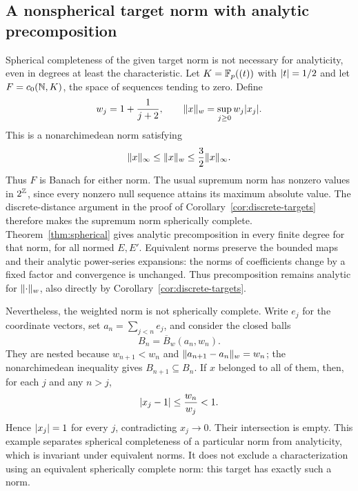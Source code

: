 \subsection{A nonspherical target norm with analytic precomposition}
\begin{remark}\label{rem:nonspherical-analytic-target}
Spherical completeness of the given target norm is not necessary for analyticity, even in degrees
at least the characteristic. Let $K=\mathbb F_p((t))$ with $\lvert t\rvert=1/2$ and let $F=c_0(\mathbb N,K)$, the space
of sequences tending to zero. Define
\[
 w_j=1+\frac1{j+2},\qquad \lVert x\rVert_w=\sup_{j\ge0}w_j\lvert x_j\rvert.
\]
This is a nonarchimedean norm satisfying
\[
 \lVert x\rVert_\infty\le\lVert x\rVert_w\le\frac32\lVert x\rVert_\infty.
\]
Thus $F$ is Banach for either norm. The usual supremum norm has nonzero values in $2^\mathbb Z$,
since every nonzero null sequence attains its maximum absolute value. The discrete-distance
argument in the proof of Corollary~\ref{cor:discrete-targets} therefore makes the supremum norm
spherically complete. Theorem~\ref{thm:spherical} gives analytic precomposition in every finite
degree for that norm, for all normed $E,E'$. Equivalent norms preserve the bounded maps and their
analytic power-series expansions: the norms of coefficients change by a fixed factor and convergence
is unchanged. Thus precomposition remains analytic for $\lVert \cdot\rVert_w$, also directly by
Corollary~\ref{cor:discrete-targets}.

Nevertheless, the weighted norm is not spherically complete. Write $e_j$ for the coordinate vectors,
set $a_n=\sum_{j<n}e_j$, and consider the closed balls
\[
 B_n=\overline B_w(a_n,w_n).
\]
They are nested because $w_{n+1}<w_n$ and $\lVert a_{n+1}-a_n\rVert_w=w_n$; the nonarchimedean
inequality gives $B_{n+1}\subseteq B_n$. If $x$ belonged to all of them, then, for each $j$ and
any $n>j$,
\[
 \lvert x_j-1\rvert\le\frac{w_n}{w_j}<1.
\]
Hence $\lvert x_j\rvert=1$ for every $j$, contradicting $x_j\to0$. Their intersection is empty.
This example separates spherical completeness of a particular norm from analyticity, which is
invariant under equivalent norms. It does not exclude a characterization using an equivalent
spherically complete norm: this target has exactly such a norm.
\end{remark}
